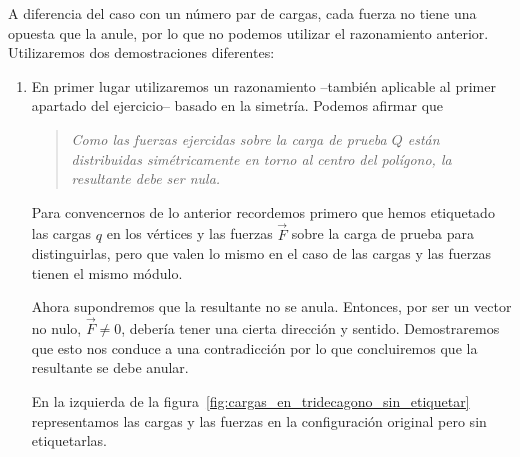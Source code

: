 \documentclass[a4paper,10pt]{article}
\begin{document}
\begin{soluc}
A diferencia del caso con un número par de cargas, cada fuerza no tiene
una opuesta que la anule, por lo que no podemos utilizar el razonamiento anterior.
Utilizaremos dos demostraciones diferentes:

\begin{enumerate}
\item En primer lugar utilizaremos  un razonamiento --también aplicable al primer
apartado del ejercicio-- basado en la simetría.
Podemos afirmar que
\begin{quotation}
  \emph{Como las fuerzas ejercidas sobre la carga de prueba $Q$ están
    distribuidas simétricamente en torno al centro del polígono,
    la resultante debe ser nula.}
\end{quotation}

Para convencernos de lo anterior recordemos primero que hemos etiquetado
las cargas $q$ en los vértices y las fuerzas $\vec{F}$ sobre la carga de
prueba para distinguirlas, pero que valen lo mismo en el caso de las cargas
y las fuerzas tienen el mismo módulo.

Ahora supondremos que la resultante no se anula. Entonces, por ser un vector
no nulo, $\vec{F}\ne 0$, debería tener una cierta dirección y sentido.
Demostraremos que esto nos conduce a una contradicción por lo que
concluiremos que la resultante se debe anular.

En la izquierda de la figura~\ref{fig:cargas_en_tridecagono_sin_etiquetar}
representamos las cargas y las fuerzas en la configuración original pero
sin etiquetarlas.

  \begin{figure}[ht]
    \def\scl{1}
    \def\lado{2.5}
    \def\qsize{7.5pt}
    \def\Qsize{6.5pt}
    \centering
\begin{minipage}{0.45\linewidth}
\end{minipage}
\end{figure}
\end{enumerate}
\end{soluc}
\end{document}
